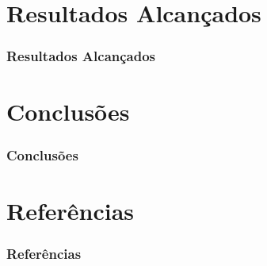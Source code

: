 \documentclass{beamer}
\begin{document}
\section{Resultados Alcançados}
\begin{frame}
\frametitle{Resultados Alcançados}
\end{frame}

\section{Conclusões}
\begin{frame}
\frametitle{Conclusões}
\end{frame}


\section{Referências}
\begin{frame}
\frametitle{Referências}

\end{frame}

\begin{frame} 
\maketitle
\end{frame}
\end{document}
